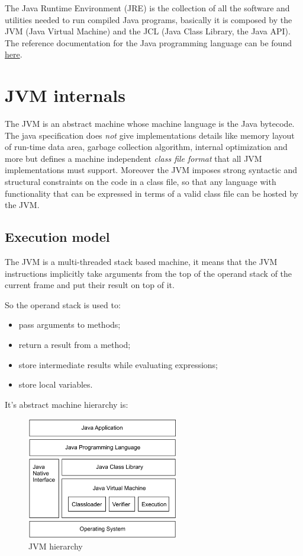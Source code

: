 The Java Runtime Environment (JRE) is the collection of all the software and utilities needed to run compiled Java programs, basically it is composed by the JVM (Java Virtual Machine) and the JCL (Java Class Library, the Java API).
The reference documentation for the Java programming language can be found \href{https://docs.oracle.com/javase/specs/index.html}{here}.

\section{JVM internals}
The JVM is an abstract machine whose machine language is the Java bytecode.
The java specification does \emph{not} give implementations details like memory layout of run-time data area, garbage collection algorithm, internal optimization and more but defines a machine independent \emph{class file format} that all JVM implementations must support.
Moreover the JVM imposes strong syntactic and structural constraints on the code in a class file, so that any language with functionality that can be expressed in terms of a valid class file can be hosted by the JVM.

\subsection{Execution model}
The JVM is a multi-threaded stack based machine, it means that the JVM instructions implicitly take arguments from the top of the operand stack of the current frame and put their result on top of it.

So the operand stack is used to:
\begin{itemize}
    \item pass arguments to methods;
    \item return a result from a method;
    \item store intermediate results while evaluating expressions;
    \item store local variables.
\end{itemize}

It's abstract machine hierarchy is:
\begin{figure}[H]
    \centering
    \includegraphics[width=250px]{images/2_JVM/JVM_hierarchy.png}
    \caption{JVM hierarchy}
\end{figure}

